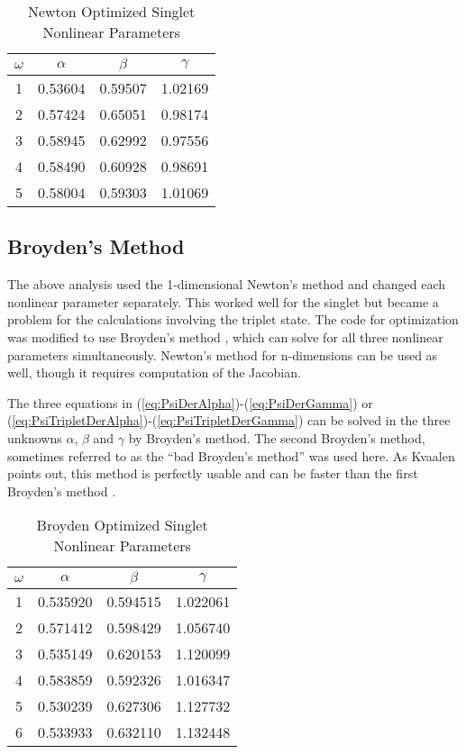 \documentclass[Dissertation.tex]{subfiles}
\begin{document}
\setlength{\abovecaptionskip}{6pt}   %
\setlength{\belowcaptionskip}{6pt}   %
\begin{table}[ht]
\caption{Newton Optimized Singlet Nonlinear Parameters} %
\centering
\begin{tabular}{c c c c}
\hline\hline
$\omega$ & $\alpha$ & $\beta$ & $\gamma$ \\ [0.5ex]
\hline
1 & 0.53604 & 0.59507 & 1.02169 \\
2 & 0.57424 & 0.65051 & 0.98174 \\
3 & 0.58945 & 0.62992 & 0.97556 \\
4 & 0.58490 & 0.60928 & 0.98691 \\
5 & 0.58004 & 0.59303 & 1.01069 \\
\hline\hline
\end{tabular}
\label{table:NonlinearOptimized1SNewton}
\end{table}


\subsection{Broyden's Method}
The above analysis used the 1-dimensional Newton's method and changed each nonlinear parameter separately.  This worked well for the singlet but became a problem for the calculations involving the triplet state.  The code for optimization was modified to use Broyden's method \cite{Sauer2006}, which can solve for all three nonlinear parameters simultaneously.  Newton's method for n-dimensions can be used as well, though it requires computation of the Jacobian.

The three equations in (\ref{eq:PsiDerAlpha})-(\ref{eq:PsiDerGamma}) or (\ref{eq:PsiTripletDerAlpha})-(\ref{eq:PsiTripletDerGamma}) can be solved in the three unknowns $\alpha$, $\beta$ and $\gamma$ by Broyden's method.  The second Broyden's method, sometimes referred to as the ``bad Broyden's method'' was used here.  As Kvaalen points out, this method is perfectly usable and can be faster than the first Broyden's method \cite{Kvaalen1991}.


\setlength{\abovecaptionskip}{6pt}   %
\setlength{\belowcaptionskip}{6pt}   %
\begin{table}[ht]
\caption{Broyden Optimized Singlet Nonlinear Parameters} %
\centering
\begin{tabular}{c c c c}
\hline\hline
$\omega$ & $\alpha$ & $\beta$ & $\gamma$ \\ [0.5ex]
\hline
1 & 0.535920 & 0.594515 & 1.022061 \\
2 & 0.571412 & 0.598429 & 1.056740 \\
3 & 0.535149 & 0.620153 & 1.120099 \\
4 & 0.583859 & 0.592326 & 1.016347 \\
5 & 0.530239 & 0.627306 & 1.127732 \\
6 & 0.533933 & 0.632110 & 1.132448 \\
\hline\hline
\end{tabular}
\label{table:NonlinearOptimized1SBroyden}
\end{table}
\end{document}
